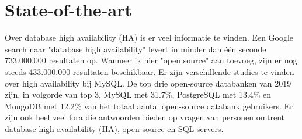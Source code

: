 
\section{State-of-the-art}
\label{sec:state-of-the-art}
Over database high availability (HA) is er veel informatie te vinden. Een Google search naar "database high availability" levert in minder dan één seconde 733.000.000 resultaten op. Wanneer ik hier "open source" aan toevoeg, zijn er nog steeds 433.000.000 resultaten beschikbaar.
Er zijn verschillende studies te vinden over high availability bij MySQL.
De top drie open-source databanken van 2019 zijn, in volgorde van top 3, MySQL met 31.7\%, PostgreSQL met 13.4\% en MongoDB met 12.2\% \autocite{Anderson2020} van het totaal aantal open-source databank gebruikers.
Er zijn ook heel veel fora die antwoorden bieden op vragen van personen omtrent database high availability (HA), open-source en SQL servers.





